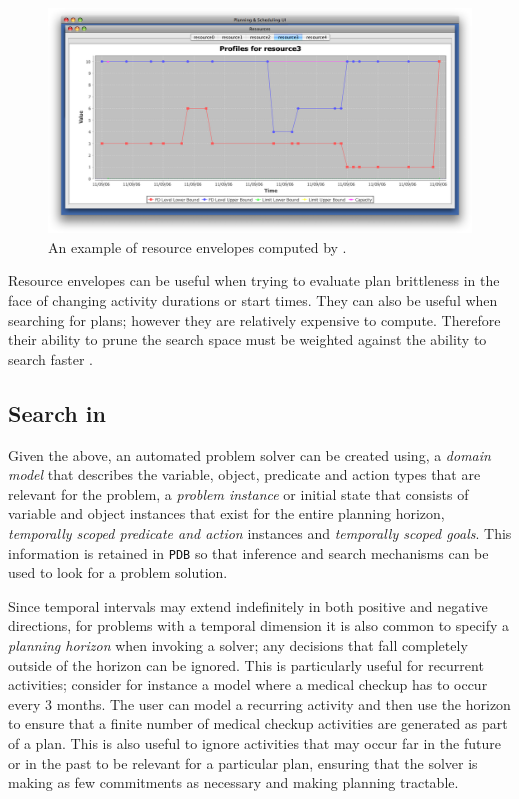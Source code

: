 \begin{figure}
\centering
\includegraphics[scale=0.2]{figs/europa-resource-envelopes.png}
\caption{\small An example of resource envelopes computed by \eu.}
\label{fig:resenvelopes}
\end{figure}

Resource envelopes can be useful when trying to evaluate plan
brittleness in the face of changing activity durations or start
times. They can also be useful when searching for plans; however they
are relatively expensive to compute. Therefore their ability to prune
the search space must be weighted against the ability to search faster
\cite{6007772}.


\subsection{Search in \eu}
\label{sec:europa:search}

Given the above, an automated problem solver can be created using, a
\emph{domain model} that describes the variable, object, predicate and
action types that are relevant for the problem, a \emph{problem
  instance} or initial state that consists of variable and object
instances that exist for the entire planning horizon, \emph{temporally
  scoped predicate and action} instances and \emph{temporally scoped
  goals}. This information is retained in \eus \texttt{PDB} so that
inference and search mechanisms can be used to look for a problem
solution.

Since temporal intervals may extend indefinitely in both positive and
negative directions, for problems with a temporal dimension it is also
common to specify a \emph{planning horizon} when invoking a solver;
any decisions that fall completely outside of the horizon can be
ignored. This is particularly useful for recurrent activities;
consider for instance a model where a medical checkup has to occur
every $3$ months. The user can model a recurring activity and then use
the horizon to ensure that a finite number of medical checkup
activities are generated as part of a plan. This is also useful to
ignore activities that may occur far in the future or in the past to
be relevant for a particular plan, ensuring that the solver is making
as few commitments as necessary and making planning tractable.

